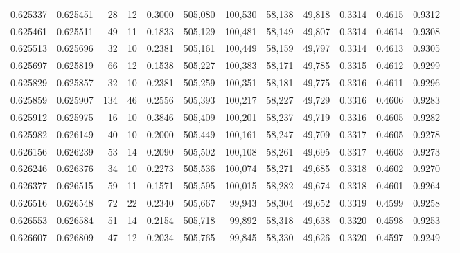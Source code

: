\begin{tabular}{rrrrrrrrrrrrr}
0.625337 & 0.625451 &    28 &  12 &                                     0.3000 & 505,080 & 100,530 &  58,138 &  49,818 & 0.3314 & 0.4615 & 0.9312 \\
0.625461 & 0.625511 &    49 &  11 &                                     0.1833 & 505,129 & 100,481 &  58,149 &  49,807 & 0.3314 & 0.4614 & 0.9308 \\
0.625513 & 0.625696 &    32 &  10 &                                     0.2381 & 505,161 & 100,449 &  58,159 &  49,797 & 0.3314 & 0.4613 & 0.9305 \\
0.625697 & 0.625819 &    66 &  12 &                                     0.1538 & 505,227 & 100,383 &  58,171 &  49,785 & 0.3315 & 0.4612 & 0.9299 \\
0.625829 & 0.625857 &    32 &  10 &                                     0.2381 & 505,259 & 100,351 &  58,181 &  49,775 & 0.3316 & 0.4611 & 0.9296 \\
0.625859 & 0.625907 &   134 &  46 &                                     0.2556 & 505,393 & 100,217 &  58,227 &  49,729 & 0.3316 & 0.4606 & 0.9283 \\
0.625912 & 0.625975 &    16 &  10 &                                     0.3846 & 505,409 & 100,201 &  58,237 &  49,719 & 0.3316 & 0.4605 & 0.9282 \\
0.625982 & 0.626149 &    40 &  10 &                                     0.2000 & 505,449 & 100,161 &  58,247 &  49,709 & 0.3317 & 0.4605 & 0.9278 \\
0.626156 & 0.626239 &    53 &  14 &                                     0.2090 & 505,502 & 100,108 &  58,261 &  49,695 & 0.3317 & 0.4603 & 0.9273 \\
0.626246 & 0.626376 &    34 &  10 &                                     0.2273 & 505,536 & 100,074 &  58,271 &  49,685 & 0.3318 & 0.4602 & 0.9270 \\
0.626377 & 0.626515 &    59 &  11 &                                     0.1571 & 505,595 & 100,015 &  58,282 &  49,674 & 0.3318 & 0.4601 & 0.9264 \\
0.626516 & 0.626548 &    72 &  22 &                                     0.2340 & 505,667 &  99,943 &  58,304 &  49,652 & 0.3319 & 0.4599 & 0.9258 \\
0.626553 & 0.626584 &    51 &  14 &                                     0.2154 & 505,718 &  99,892 &  58,318 &  49,638 & 0.3320 & 0.4598 & 0.9253 \\
0.626607 & 0.626809 &    47 &  12 &                                     0.2034 & 505,765 &  99,845 &  58,330 &  49,626 & 0.3320 & 0.4597 & 0.9249 \\

\end{tabular}
